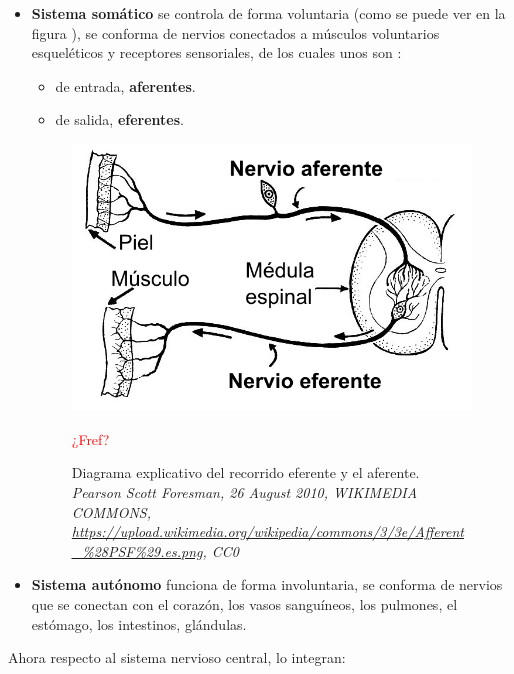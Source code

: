 \begin{itemize}
 \item \textbf{Sistema somático} se controla de forma voluntaria (como se puede ver en la figura ), se conforma de nervios conectados a músculos voluntarios esqueléticos y receptores sensoriales, de los cuales unos son :
 \begin{itemize}
  \item de entrada, \textbf{aferentes}.
  \item de salida, \textbf{eferentes}.
 \end{itemize}


 \begin{figure}[h]
 \centering
 \includegraphics[scale=0.5]{../Figuras/afferent_efferent.png}
 \caption{Diagrama explicativo del recorrido eferente y el aferente.  \textit{Pearson Scott Foresman, 26 August 2010, WIKIMEDIA COMMONS, \url{https://upload.wikimedia.org/wikipedia/commons/3/3e/Afferent_\%28PSF\%29.es.png}, CC0}}  \textcolor{red}{¿Fref?}
 \label{axonesSA}
 \end{figure} 
 
\item \textbf{Sistema autónomo} funciona de forma involuntaria, se conforma de nervios que se conectan con el corazón, los vasos sanguíneos, los pulmones, el estómago, los intestinos, glándulas.
\end{itemize}


Ahora respecto al sistema nervioso central, lo integran:


